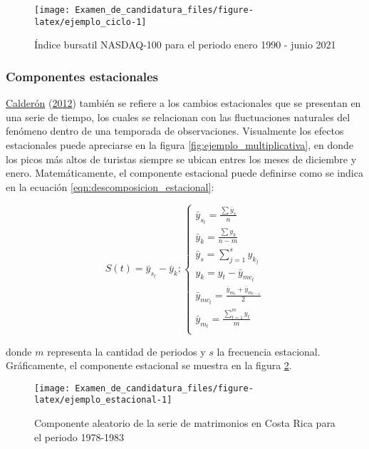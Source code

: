 \documentclass[
]{article}
\begin{document}
\begin{figure}[H]
\texttt{[image: Examen\_de\_candidatura\_files/figure-latex/ejemplo\_ciclo-1]} \caption{Índice bursatil NASDAQ-100 para el periodo enero 1990 - junio 2021}\label{fig:ejemplo_ciclo}
\end{figure}

\subsubsection{Componentes estacionales}

\protect\hyperlink{ref-calderon2012estadistica}{Calderón}
(\protect\hyperlink{ref-calderon2012estadistica}{2012}) también se
refiere a los cambios estacionales que se presentan en una serie de
tiempo, los cuales se relacionan con las fluctuaciones naturales del
fenómeno dentro de una temporada de observaciones. Visualmente los
efectos estacionales puede apreciarse en la figura
\ref{fig:ejemplo_multiplicativa}, en donde los picos más altos de
turistas siempre se ubican entres los meses de diciembre y enero.
Matemáticamente, el componente estacional puede definirse como se indica
en la ecuación \ref{eqn:descomposicion_estacional}:

\begin{equation}
\label{eqn:descomposicion_estacional}
S(t)=\bar{y}_{s_t}-\bar{y}_{k};
\begin{cases}
\bar{y}_{s_t} = \frac{\sum \bar{y}_s}{n} \\
\bar{y}_k = \frac{\sum y_k}{n-m} \\
\bar{y}_s = \sum_{j=1}^s y_{k_j} \\
y_k = y_t - \bar{y}_{mc_t} \\
\bar{y}_{mc_t} = \frac{\bar{y}_{m_t} + \bar{y}_{m_{t-1}}}{2} \\
\bar{y}_{m_t} = \frac{\sum_{t=1}^m y_t}{m} \\
\end{cases}
\end{equation}

donde \(m\) representa la cantidad de periodos y \(s\) la frecuencia
estacional. Gráficamente, el componente estacional se muestra en la
figura \ref{fig:ejemplo_estacional}.

\begin{figure}[H]
\texttt{[image: Examen\_de\_candidatura\_files/figure-latex/ejemplo\_estacional-1]} \caption{Componente aleatorio de la serie de matrimonios en Costa Rica para el periodo 1978-1983}\label{fig:ejemplo_estacional}
\end{figure}
\end{document}
